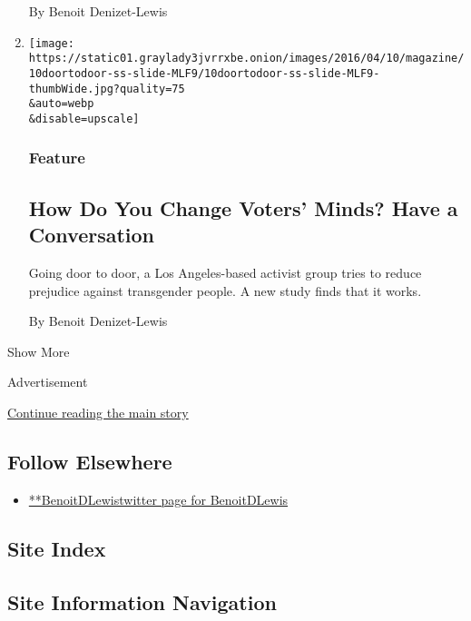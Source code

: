 \begin{enumerate}
  By Benoit Denizet-Lewis
\item
  \href{/2016/04/10/magazine/how-do-you-change-voters-minds-have-a-conversation.html}{}

  \texttt{[image: https://static01.graylady3jvrrxbe.onion/images/2016/04/10/magazine/10doortodoor-ss-slide-MLF9/10doortodoor-ss-slide-MLF9-thumbWide.jpg?quality=75\\\&auto=webp\\\&disable=upscale]}

  \hypertarget{feature-2}{%
  \subsubsection{Feature}\label{feature-2}}

  \hypertarget{how-do-you-change-voters-minds-have-a-conversation}{%
  \subsection{How Do You Change Voters' Minds? Have a
  Conversation}\label{how-do-you-change-voters-minds-have-a-conversation}}

  Going door to door, a Los Angeles-based activist group tries to reduce
  prejudice against transgender people. A new study finds that it works.

  By Benoit Denizet-Lewis
\end{enumerate}

Show More

Advertisement

\protect\hyperlink{after-mid2}{Continue reading the main story}

\hypertarget{follow-elsewhere}{%
\subsection{Follow Elsewhere}\label{follow-elsewhere}}

\begin{itemize}
\tightlist
\item
  \href{https://twitter.com/BenoitDLewis}{**BenoitDLewistwitter page for
  BenoitDLewis}
\end{itemize}

\hypertarget{site-index}{%
\subsection{Site Index}\label{site-index}}

\hypertarget{site-information-navigation}{%
\subsection{Site Information
Navigation}\label{site-information-navigation}}

